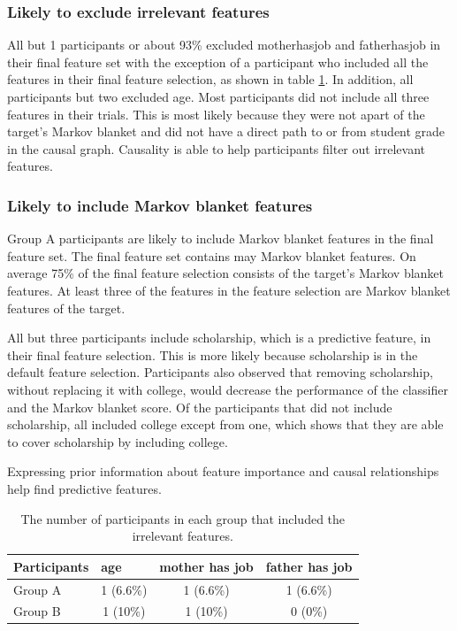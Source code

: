 \subsubsection { Likely to exclude irrelevant features }
All but 1 participants or about 93\% excluded motherhasjob and fatherhasjob in their final feature set with the exception of a participant who included all the features in their final feature selection, as shown in table \ref{IrrelevantFeatures}. In addition, all participants but two excluded age. Most participants did not include all three features in their trials. This is most likely because they were not apart of the target's Markov blanket and did not have a direct path to or from student grade in the causal graph. Causality is able to help participants filter out irrelevant features.

\subsubsection { Likely to include Markov blanket features }
Group A participants are likely to include Markov blanket features in the final feature set. The final feature set contains may Markov blanket features. On average 75\% of the final feature selection consists of the target's Markov blanket features. At least three of the features in the feature selection are Markov blanket features of the target.

All but three participants include scholarship, which is a predictive feature, in their final feature selection. This is more likely because scholarship is in the default feature selection. Participants also observed that removing scholarship, without replacing it with college, would decrease the performance of the classifier and the Markov blanket score. Of the participants that did not include scholarship, all included college except from one, which shows that they are able to cover scholarship by including college.

Expressing prior information about feature importance and causal relationships help find predictive features.

\begin{table}[]
\centering
\begin{tabular}{lccc}
\hline
Participants & \multicolumn{1}{l}{age} & \multicolumn{1}{l}{mother has job} & \multicolumn{1}{l}{father has job} \\ \hline
Group A      & 1 (6.6\%)                &  1 (6.6\%)     &  1 (6.6\%)                                  \\
Group B      & 1 (10\%)                 &  1 (10\%)   & 0 (0\%) \\\hline
\end{tabular}
\caption{The number of participants in each group that included the irrelevant features.}
\label{IrrelevantFeatures}
\end{table}

